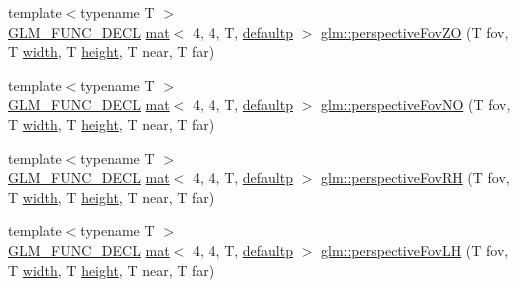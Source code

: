\begin{DoxyCompactItemize}
\item 
{\footnotesize template$<$typename T $>$ }\\\mbox{\hyperlink{setup_8hpp_ab2d052de21a70539923e9bcbf6e83a51}{G\+L\+M\+\_\+\+F\+U\+N\+C\+\_\+\+D\+E\+CL}} \mbox{\hyperlink{structglm_1_1mat}{mat}}$<$ 4, 4, T, \mbox{\hyperlink{namespaceglm_a36ed105b07c7746804d7fdc7cc90ff25a9d21ccd8b5a009ec7eb7677befc3bf51}{defaultp}} $>$ \mbox{\hyperlink{group__gtc__matrix__transform_ga4bc69fa1d1f95128430aa3d2a712390b}{glm\+::perspective\+Fov\+ZO}} (T fov, T \mbox{\hyperlink{_s_d_l__opengl_8h_a9a82cf3caff84cabc4598e2619faac17}{width}}, T \mbox{\hyperlink{_s_d_l__opengl_8h_aa352f2804b9902ac30769c00dde75d5f}{height}}, T near, T far)
\item 
{\footnotesize template$<$typename T $>$ }\\\mbox{\hyperlink{setup_8hpp_ab2d052de21a70539923e9bcbf6e83a51}{G\+L\+M\+\_\+\+F\+U\+N\+C\+\_\+\+D\+E\+CL}} \mbox{\hyperlink{structglm_1_1mat}{mat}}$<$ 4, 4, T, \mbox{\hyperlink{namespaceglm_a36ed105b07c7746804d7fdc7cc90ff25a9d21ccd8b5a009ec7eb7677befc3bf51}{defaultp}} $>$ \mbox{\hyperlink{group__gtc__matrix__transform_gaf30e7bd3b1387a6776433dd5383e6633}{glm\+::perspective\+Fov\+NO}} (T fov, T \mbox{\hyperlink{_s_d_l__opengl_8h_a9a82cf3caff84cabc4598e2619faac17}{width}}, T \mbox{\hyperlink{_s_d_l__opengl_8h_aa352f2804b9902ac30769c00dde75d5f}{height}}, T near, T far)
\item 
{\footnotesize template$<$typename T $>$ }\\\mbox{\hyperlink{setup_8hpp_ab2d052de21a70539923e9bcbf6e83a51}{G\+L\+M\+\_\+\+F\+U\+N\+C\+\_\+\+D\+E\+CL}} \mbox{\hyperlink{structglm_1_1mat}{mat}}$<$ 4, 4, T, \mbox{\hyperlink{namespaceglm_a36ed105b07c7746804d7fdc7cc90ff25a9d21ccd8b5a009ec7eb7677befc3bf51}{defaultp}} $>$ \mbox{\hyperlink{group__gtc__matrix__transform_gaf32bf563f28379c68554a44ee60c6a85}{glm\+::perspective\+Fov\+RH}} (T fov, T \mbox{\hyperlink{_s_d_l__opengl_8h_a9a82cf3caff84cabc4598e2619faac17}{width}}, T \mbox{\hyperlink{_s_d_l__opengl_8h_aa352f2804b9902ac30769c00dde75d5f}{height}}, T near, T far)
\item 
{\footnotesize template$<$typename T $>$ }\\\mbox{\hyperlink{setup_8hpp_ab2d052de21a70539923e9bcbf6e83a51}{G\+L\+M\+\_\+\+F\+U\+N\+C\+\_\+\+D\+E\+CL}} \mbox{\hyperlink{structglm_1_1mat}{mat}}$<$ 4, 4, T, \mbox{\hyperlink{namespaceglm_a36ed105b07c7746804d7fdc7cc90ff25a9d21ccd8b5a009ec7eb7677befc3bf51}{defaultp}} $>$ \mbox{\hyperlink{group__gtc__matrix__transform_ga6aebe16c164bd8e52554cbe0304ef4aa}{glm\+::perspective\+Fov\+LH}} (T fov, T \mbox{\hyperlink{_s_d_l__opengl_8h_a9a82cf3caff84cabc4598e2619faac17}{width}}, T \mbox{\hyperlink{_s_d_l__opengl_8h_aa352f2804b9902ac30769c00dde75d5f}{height}}, T near, T far)

\end{DoxyCompactItemize}
